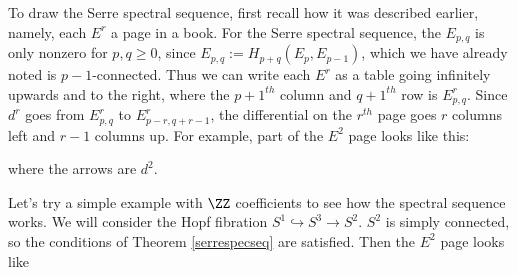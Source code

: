 \documentclass[12pt,oneside]{amsart}
\begin{document}
To draw the Serre spectral sequence, first recall how it was described earlier, namely, each $E^r$ a page in a book. For the Serre spectral sequence, the $E_{p,q}$ is only nonzero for $p,q \geq 0$, since $E_{p,q} := H_{p+q}(E_p,E_{p-1})$, which we have already noted is $p-1$-connected. Thus we can write each $E^r$ as a table going infinitely upwards and to the right, where the $p+1^{th}$ column and $q+1^{th}$ row is $E^r_{p,q}$. Since $d^r$ goes from $E^r_{p,q}$ to $E^r_{p-r,q+r-1}$, the differential on the $r^{th}$ page goes $r$ columns left and $r-1$ columns up. For example, part of the $E^2$ page looks like this:
\begin{center}
\end{center}

where the arrows are $d^2$.

Let's try a simple example with $\ZZ$ coefficients to see how the spectral sequence works. We will consider the Hopf fibration $S^1 \hookrightarrow S^3 \rightarrow S^2$. $S^2$ is simply connected, so the conditions of Theorem \ref{serrespecseq} are satisfied. Then the $E^2$ page looks like
\end{document}
